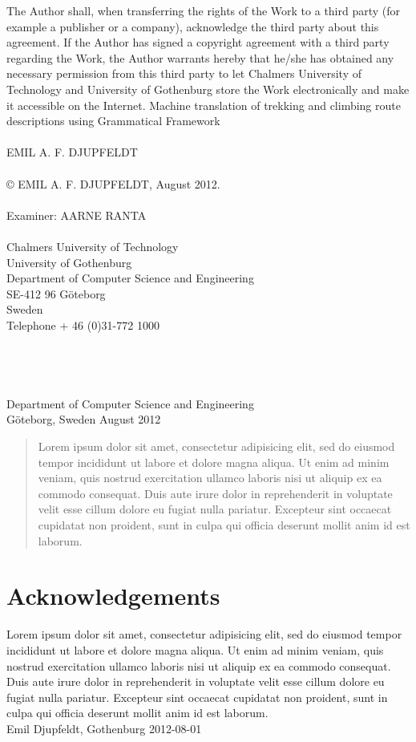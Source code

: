 The Author shall, when transferring the rights of the Work to a third party (for example a publisher or a company), acknowledge the third party about this agreement. If the Author has signed a copyright agreement with a third party regarding the Work, the Author warrants hereby that he/she has obtained any necessary permission from this third party to let Chalmers University of Technology and University of Gothenburg  store the Work electronically and make it accessible on the Internet.
\vfill
Machine translation of trekking and climbing route descriptions using Grammatical Framework\\
\\
EMIL A. F. DJUPFELDT\\
\\
© EMIL A. F. DJUPFELDT, August 2012.\\
\\
Examiner: AARNE RANTA\\
\\
Chalmers University of Technology\\
University of Gothenburg\\
Department of Computer Science and Engineering\\
SE-412 96 Göteborg\\
Sweden\\
Telephone + 46 (0)31-772 1000\\
\\
\\
\\
\\
Department of Computer Science and Engineering\\
Göteborg, Sweden August 2012

\newpage
\clearpage
\thispagestyle{empty}

\begin{abstract}
Lorem ipsum dolor sit amet, consectetur adipisicing elit, sed do eiusmod tempor incididunt ut labore et dolore magna aliqua. Ut enim ad minim veniam, quis nostrud exercitation ullamco laboris nisi ut aliquip ex ea commodo consequat. Duis aute irure dolor in reprehenderit in voluptate velit esse cillum dolore eu fugiat nulla pariatur. Excepteur sint occaecat cupidatat non proident, sunt in culpa qui officia deserunt mollit anim id est laborum.
\end{abstract}

\newpage
\clearpage
\mbox{}
\newpage
\clearpage
\thispagestyle{empty}
\section*{Acknowledgements}
Lorem ipsum dolor sit amet, consectetur adipisicing elit, sed do eiusmod tempor incididunt ut labore et dolore magna aliqua. Ut enim ad minim veniam, quis nostrud exercitation ullamco laboris nisi ut aliquip ex ea commodo consequat. Duis aute irure dolor in reprehenderit in voluptate velit esse cillum dolore eu fugiat nulla pariatur. Excepteur sint occaecat cupidatat non proident, sunt in culpa qui officia deserunt mollit anim id est laborum. \\[1cm]

\hfill Emil Djupfeldt, Gothenburg 2012-08-01
\newpage
\clearpage
\mbox{}